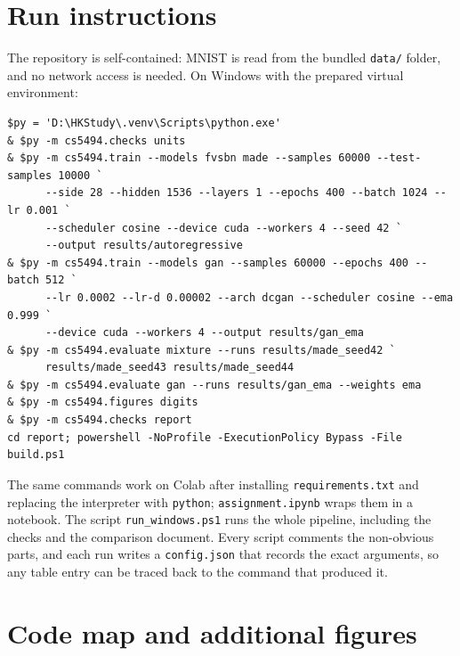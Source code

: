 \documentclass[11pt,a4paper]{article}
\begin{document}
\newpage
\appendix

\section{Run instructions}

The repository is self-contained: MNIST is read from the bundled \texttt{data/} folder, and no
network access is needed. On Windows with the prepared virtual environment:

\begin{verbatim}
$py = 'D:\HKStudy\.venv\Scripts\python.exe'
& $py -m cs5494.checks units
& $py -m cs5494.train --models fvsbn made --samples 60000 --test-samples 10000 `
      --side 28 --hidden 1536 --layers 1 --epochs 400 --batch 1024 --lr 0.001 `
      --scheduler cosine --device cuda --workers 4 --seed 42 `
      --output results/autoregressive
& $py -m cs5494.train --models gan --samples 60000 --epochs 400 --batch 512 `
      --lr 0.0002 --lr-d 0.00002 --arch dcgan --scheduler cosine --ema 0.999 `
      --device cuda --workers 4 --output results/gan_ema
& $py -m cs5494.evaluate mixture --runs results/made_seed42 `
      results/made_seed43 results/made_seed44
& $py -m cs5494.evaluate gan --runs results/gan_ema --weights ema
& $py -m cs5494.figures digits
& $py -m cs5494.checks report
cd report; powershell -NoProfile -ExecutionPolicy Bypass -File build.ps1
\end{verbatim}

The same commands work on Colab after installing \texttt{requirements.txt} and replacing
the interpreter with \texttt{python}; \texttt{assignment.ipynb} wraps them in a notebook.
The script \texttt{run\_windows.ps1} runs the whole pipeline, including the checks and
the comparison document. Every script comments the non-obvious parts, and each run writes a
\texttt{config.json} that records the exact arguments, so any table entry can be traced back
to the command that produced it.

\section{Code map and additional figures}
\end{document}
